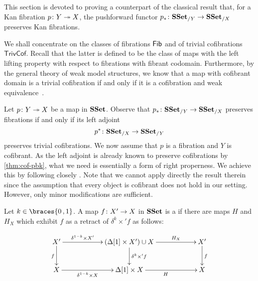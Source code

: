 \documentclass[reqno,10pt,a4paper,oneside,draft]{amsart}
\begin{document}
This section is devoted to proving a counterpart of the classical result that, for a Kan fibration $p \colon Y \twoheadrightarrow X$, the pushforward functor $p_* \colon \mathbf{SSet}_{/Y} \to \mathbf{SSet}_{/X}$ preserves Kan
fibrations. 

\medskip

We shall concentrate on the classes of fibrations $\mathsf{Fib}$ and of trivial cofibrations $\mathsf{TrivCof}$. 
Recall that the latter is defined to be the class of maps with the left lifting property
with respect to fibrations with fibrant codomain. Furthermore, by the general theory of weak model
structures, we know that a map with cofibrant domain is a trivial cofibration if and only if it is a cofibration
and weak equivalence~\cite[Proposition~2.2.9]{henry2018wms}.  

\medskip

Let $p \colon Y \twoheadrightarrow X$ be a map in $\mathbf{SSet}$. Observe that $p_* \colon \mathbf{SSet}_{/Y} \to \mathbf{SSet}_{/X}$  preserves fibrations if and only if its left adjoint 
\[
p^* \colon \mathbf{SSet}_{/X} \to \mathbf{SSet}_{/Y}
\]
preserves trivial cofibrations. We now assume that $p$ is a fibration and $Y$ is cofibrant. 
As the left adjoint is already known to preserve cofibrations by \cref{thm:cof-pbk}, what we need is essentially a form of right properness. We achieve this by following closely \cite[Section~3]{gambino2017frobenius}. Note that we cannot apply directly the result therein since 
the assumption that every object is cofibrant does not hold in our setting. However, only minor modifications are sufficient.




\begin{definition} \label{def:strhtpyequiv} Let $k \in \braces{0 \, , 1 }$.
A map $f \colon X' \rightarrow X$ in $\mathbf{SSet}$ is a  if there are maps $H$ and $H_X$ which exhibit $f$ as a retract of $\delta^k \times ' f$ as follows:

\[
\xymatrix@C=2cm{
X' \ar[d]_{f} \ar[r]^-{\delta^{1-k} \times X'} & 
( \Delta[1] \times X' ) \cup X \ar[d]^{\delta^k \times' f} \ar[r]^-{H_X} & 
X' \ar[d]^{f} \\
X \ar[r]_-{\delta^{1-k} \times X}  & 
\Delta[1] \times X \ar[r]_{H} &
X  }
\]
\end{definition}
\end{document}
